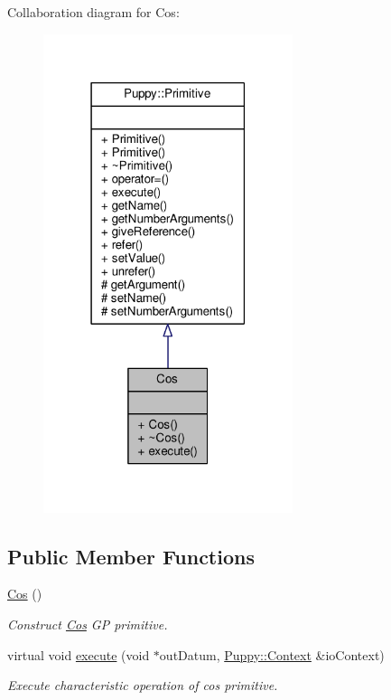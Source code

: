Collaboration diagram for Cos\+:
\nopagebreak
\begin{figure}[H]
\begin{center}
\leavevmode
\includegraphics[width=207pt]{classCos__coll__graph}
\end{center}
\end{figure}
\subsection*{Public Member Functions}
\begin{DoxyCompactItemize}
\item 
\hypertarget{classCos_afcabb31f1ff7871afba44a04b78e24c1}{}\hyperlink{classCos_afcabb31f1ff7871afba44a04b78e24c1}{Cos} ()\label{classCos_afcabb31f1ff7871afba44a04b78e24c1}

\begin{DoxyCompactList}\small\item\em Construct \hyperlink{classCos}{Cos} G\+P primitive. \end{DoxyCompactList}\item 
virtual void \hyperlink{classCos_ae797f1f97801e6a64e4bded4f4f4f263}{execute} (void $\ast$out\+Datum, \hyperlink{classPuppy_1_1Context}{Puppy\+::\+Context} \&io\+Context)
\begin{DoxyCompactList}\small\item\em Execute characteristic operation of cos primitive. \end{DoxyCompactList}\end{DoxyCompactItemize}
